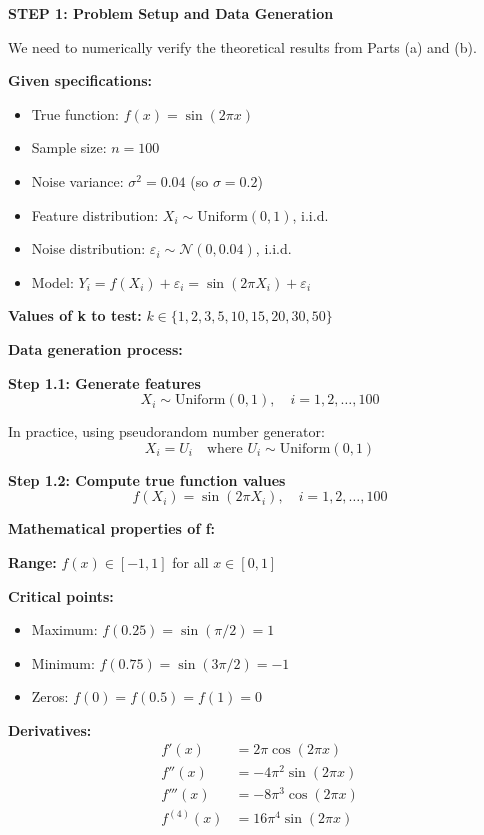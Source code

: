 \documentclass[12pt]{article}
\begin{document}
\begin{solution}
\textbf{STEP 1: Problem Setup and Data Generation}

We need to numerically verify the theoretical results from Parts (a) and (b).

\textbf{Given specifications:}
\begin{itemize}
    \item True function: $f(x) = \sin(2\pi x)$
    \item Sample size: $n = 100$
    \item Noise variance: $\sigma^2 = 0.04$ (so $\sigma = 0.2$)
    \item Feature distribution: $X_i \sim \text{Uniform}(0, 1)$, i.i.d.
    \item Noise distribution: $\varepsilon_i \sim \mathcal{N}(0, 0.04)$, i.i.d.
    \item Model: $Y_i = f(X_i) + \varepsilon_i = \sin(2\pi X_i) + \varepsilon_i$
\end{itemize}

\textbf{Values of k to test:} $k \in \{1, 2, 3, 5, 10, 15, 20, 30, 50\}$

\textbf{Data generation process:}

\textbf{Step 1.1: Generate features}
\[
X_i \sim \text{Uniform}(0, 1), \quad i = 1, 2, \ldots, 100
\]

In practice, using pseudorandom number generator:
\[
X_i = U_i \quad \text{where } U_i \sim \text{Uniform}(0,1)
\]

\textbf{Step 1.2: Compute true function values}
\[
f(X_i) = \sin(2\pi X_i), \quad i = 1, 2, \ldots, 100
\]

\textbf{Mathematical properties of f:}

\textbf{Range:} $f(x) \in [-1, 1]$ for all $x \in [0,1]$

\textbf{Critical points:}
\begin{itemize}
    \item Maximum: $f(0.25) = \sin(\pi/2) = 1$
    \item Minimum: $f(0.75) = \sin(3\pi/2) = -1$
    \item Zeros: $f(0) = f(0.5) = f(1) = 0$
\end{itemize}

\textbf{Derivatives:}
\begin{align*}
f'(x) &= 2\pi\cos(2\pi x) \\
f''(x) &= -4\pi^2\sin(2\pi x) \\
f'''(x) &= -8\pi^3\cos(2\pi x) \\
f^{(4)}(x) &= 16\pi^4\sin(2\pi x)
\end{align*}


\end{solution}
\end{document}
